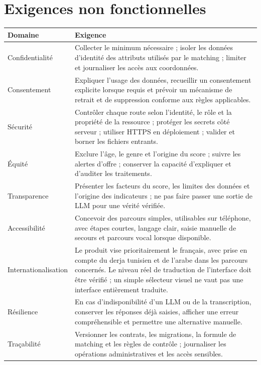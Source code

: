 \documentclass[11pt,a4paper]{article}
\begin{document}
\section{Exigences non fonctionnelles}

\begin{longtable}{>{\raggedright\arraybackslash}p{} >{\raggedright\arraybackslash}p{}}
\toprule
\textbf{Domaine} & \textbf{Exigence}\\
\midrule
\endhead
Confidentialité & Collecter le minimum nécessaire ; isoler les données d'identité des attributs utilisés par le matching ; limiter et journaliser les accès aux coordonnées.\\
Consentement & Expliquer l'usage des données, recueillir un consentement explicite lorsque requis et prévoir un mécanisme de retrait et de suppression conforme aux règles applicables.\\
Sécurité & Contrôler chaque route selon l'identité, le rôle et la propriété de la ressource ; protéger les secrets côté serveur ; utiliser HTTPS en déploiement ; valider et borner les fichiers entrants.\\
Équité & Exclure l'âge, le genre et l'origine du score ; suivre les alertes d'offre ; conserver la capacité d'expliquer et d'auditer les traitements.\\
Transparence & Présenter les facteurs du score, les limites des données et l'origine des indicateurs ; ne pas faire passer une sortie de LLM pour une vérité vérifiée.\\
Accessibilité & Concevoir des parcours simples, utilisables sur téléphone, avec étapes courtes, langage clair, saisie manuelle de secours et parcours vocal lorsque disponible.\\
Internationalisation & Le produit vise prioritairement le français, avec prise en compte du derja tunisien et de l'arabe dans les parcours concernés. Le niveau réel de traduction de l'interface doit être vérifié ; un simple sélecteur visuel ne vaut pas une interface entièrement traduite.\\
Résilience & En cas d'indisponibilité d'un LLM ou de la transcription, conserver les réponses déjà saisies, afficher une erreur compréhensible et permettre une alternative manuelle.\\
Traçabilité & Versionner les contrats, les migrations, la formule de matching et les règles de contrôle ; journaliser les opérations administratives et les accès sensibles.\\
\bottomrule
\end{longtable}
\end{document}
